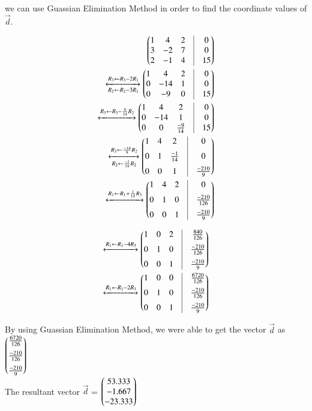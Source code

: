 \documentclass[journal,12pt,twocolumn]{IEEEtran}
\begin{document}
    
    we can use Guassian Elimination Method in order to find the coordinate values of $\vec{d}$.
    
    

	\begin{align}
		\myvec{
			1 & 4 & 2 & \vrule & 0 \\
			3 & -2 & 7 & \vrule & 0 \\
			2 & -1 & 4 & \vrule & 15 \\
		}
		\\
		\xleftrightarrow[R_2 \leftarrow R_2-3R_1]{R_3 \leftarrow R_3 - 2R_1}
		\myvec{
			1 & 4 & 2 & \vrule & 0 \\
			0 & -14 & 1 & \vrule & 0 \\
			0 & -9 & 0 & \vrule & 15
		}
		\\
		\xleftrightarrow[]{R_3\leftarrow R_3-\frac{9}{14}R_2}
		\myvec{
			1 & 4 & 2 & \vrule & 0 \\
			0 & -14 & 1 & \vrule & 0 \\
			0 & 0 & \frac{-9}{14} & \vrule & 15
		}\\
		\xleftrightarrow[R_2 \leftarrow \frac{-1}{14}R_2]{R_3 \leftarrow \frac{-14}{9}R_2}
		\myvec{
			1 & 4 & 2 & \vrule & 0 \\[0.2cm]
			0 & 1 & \frac{-1}{14} & \vrule & 0 \\[0.2cm]
			0 & 0 & 1 & \vrule & \frac{-210}{9}
		}\\
		\xleftrightarrow[]{R_1 \leftarrow R_1+\frac{1}{14}R_3}
		\myvec{
			1 & 4 & 2 & \vrule & 0 \\[0.2cm]
			0 & 1 & 0 & \vrule & \frac{-210}{126} \\[0.2cm]
			0 & 0 & 1 & \vrule & \frac{-210}{9}
		}
	\end{align}


	\begin{align}
		\xleftrightarrow[]{R_1 \leftarrow R_1-4R_3}
		\myvec{
			1 & 0 & 2 & \vrule & \frac{840}{126} \\[0.2cm]
			0 & 1 & 0 & \vrule & \frac{-210}{126} \\[0.2cm]
			0 & 0 & 1 & \vrule & \frac{-210}{9}
		}\\
		\xleftrightarrow[]{R_1 \leftarrow R_1-2R_3}
		\myvec{
			1 & 0 & 0 & \vrule & \frac{6720}{126} \\[0.2cm]
			0 & 1 & 0 & \vrule & \frac{-210}{126} \\[0.2cm]
			0 & 0 & 1 & \vrule & \frac{-210}{9}
		}
\end{align}


By using Guassian Elimination Method, we were able to get the vector $\vec{d}$ as
	$\begin{pmatrix}\frac{6720}{126} \\[0.2cm]\frac{-210}{126} \\[0.2cm]\frac{-210}{9}\end{pmatrix}$\\[0.5cm]
	
The resultant vector $\vec{d}$ = $\begin{pmatrix}53.333\\-1.667\\-23.333\end{pmatrix}$
    
\end{document}

